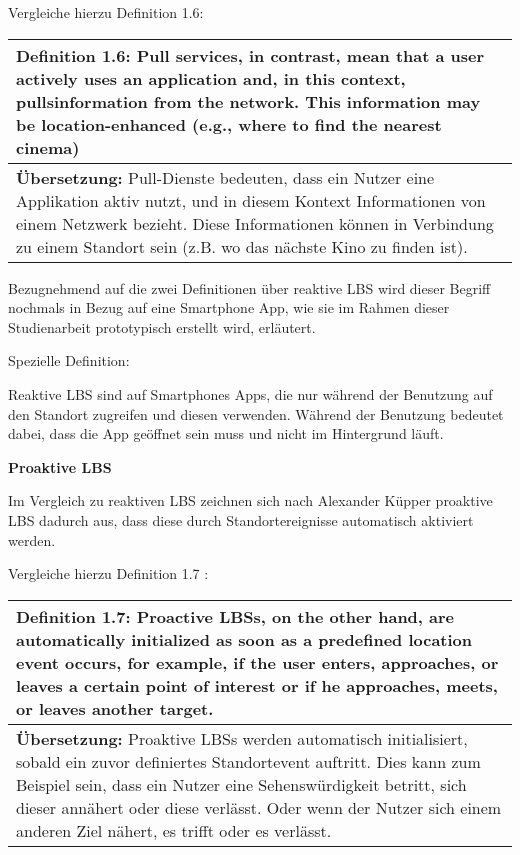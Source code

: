 Vergleiche hierzu Definition 1.6:

\begin{table}[h]
	\centering
	\begin{tabular}{|p{16cm}|}\hline
		\textbf{Definition 1.6:} \glqq Pull services, in contrast, mean that a user actively uses an application and, in this context, \grqq pulls\grqq information from the network. This information may be location-enhanced (e.g., where to find the nearest cinema) \grqq \cite[S.20]{Schiller2004} \\ \hline
		\textbf{Übersetzung:} Pull-Dienste bedeuten, dass ein Nutzer eine Applikation aktiv nutzt, und in diesem Kontext Informationen von einem Netzwerk bezieht. Diese Informationen können in Verbindung zu einem Standort sein (z.B. wo das nächste Kino zu finden ist). \\ \hline
	\end{tabular}
\end{table}

Bezugnehmend auf die zwei Definitionen über reaktive LBS wird dieser Begriff nochmals in Bezug auf eine Smartphone App, wie sie im Rahmen dieser Studienarbeit prototypisch erstellt wird, erläutert.

Spezielle Definition: 

Reaktive LBS sind auf Smartphones Apps, die nur während der Benutzung auf den Standort zugreifen und diesen verwenden. Während der Benutzung bedeutet dabei, dass die App geöffnet sein muss und nicht im Hintergrund läuft.


\textbf{Proaktive LBS}

Im Vergleich zu reaktiven LBS zeichnen sich nach Alexander Küpper proaktive LBS dadurch aus, dass diese durch Standortereignisse automatisch aktiviert werden.

Vergleiche hierzu Definition 1.7 :

\begin{table}[h]
	\centering
	\begin{tabular}{|p{16cm}|}\hline
		\textbf{Definition 1.7:} \glqq Proactive LBSs, on the other hand, are automatically initialized as soon as a predefined location event occurs, for example, if the user enters, approaches, or leaves a certain point of interest or if he approaches, meets, or leaves another target. \grqq \cite[S.3]{Kuepper2005} \\ \hline
		\textbf{Übersetzung:} Proaktive LBSs werden automatisch initialisiert, sobald ein zuvor definiertes Standortevent auftritt. Dies kann zum Beispiel sein, dass ein Nutzer eine Sehenswürdigkeit betritt, sich dieser annähert oder diese verlässt. Oder wenn der Nutzer sich einem anderen Ziel nähert, es trifft oder es verlässt. \\ \hline
	\end{tabular}
\end{table}


